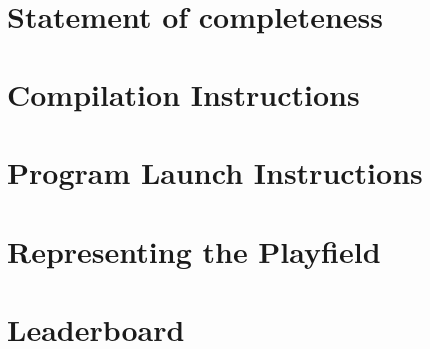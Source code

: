 \documentclass[titlepage]{article}
\title{
\vspace{2in}
\textmd{\huge\textbf{\Class}}\\
\textmd{{\Title}}\\
\vspace{3in}
\textmd{{\AuthorName}}
}
\author{}
\begin{document}
\maketitle
\clearpage

\section{Statement of completeness}



\section{Compilation Instructions}



\section{Program Launch Instructions}



\clearpage

\section{Representing the Playfield}



\section{Leaderboard}
\end{document}
